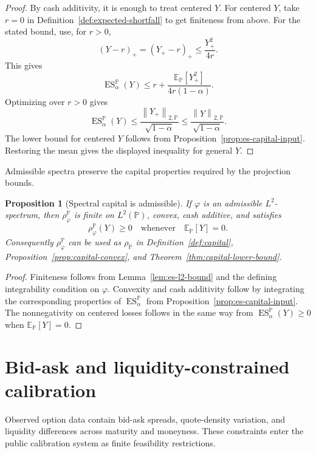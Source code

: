 \documentclass[11pt,a4paper]{amsart}
\theoremstyle{plain}
\newtheorem{proposition}[theorem]{Proposition}
\theoremstyle{definition}
\theoremstyle{remark}
\newcommand{\PP}{\mathbb{P}}
\newcommand{\EE}{\mathbb{E}}
\newcommand{\norm}[1]{\left\lVert #1\right\rVert}
\newcommand{\ES}{\operatorname{ES}}
\begin{document}
\begin{proof}
By cash additivity, it is enough to treat centered \(Y\).  For centered \(Y\), take \(r=0\) in
Definition~\ref{def:expected-shortfall} to get finiteness from above.  For the stated bound, use,
for \(r>0\),
\[
        (Y-r)_+=(Y_+-r)_+\le \frac{Y_+^2}{4r}.
\]
This gives
\[
        \ES_\alpha^\PP(Y)
        \le
        r+\frac{\EE_\PP[Y_+^2]}{4r(1-\alpha)}.
\]
Optimizing over \(r>0\) gives
\[
        \ES_\alpha^\PP(Y)
        \le
        \frac{\norm{Y_+}_{2,\PP}}{\sqrt{1-\alpha}}
        \le
        \frac{\norm{Y}_{2,\PP}}{\sqrt{1-\alpha}}.
\]
The lower bound for centered \(Y\) follows from Proposition~\ref{prop:es-capital-input}.  Restoring
the mean gives the displayed inequality for general \(Y\).
\end{proof}

Admissible spectra preserve the capital properties required by the projection bounds.

\begin{proposition}[Spectral capital is admissible]\label{prop:spectral-admissible}
If \(\varphi\) is an admissible \(L^2\)-spectrum, then
\(\rho_{\varphi}^{\PP}\) is finite on \(L^2(\PP)\), convex, cash additive, and satisfies
\[
        \rho_\varphi^\PP(Y)\ge0
        \quad\text{whenever}\quad
        \EE_\PP[Y]=0.
\]
Consequently \(\rho_\varphi^\PP\) can be used as \(\rho_\PP\) in
Definition~\ref{def:capital}, Proposition~\ref{prop:capital-convex}, and
Theorem~\ref{thm:capital-lower-bound}.
\end{proposition}

\begin{proof}
Finiteness follows from Lemma~\ref{lem:es-l2-bound} and the defining integrability condition on
\(\varphi\).  Convexity and cash additivity follow by integrating the corresponding properties of
\(\ES_\alpha^\PP\) from Proposition~\ref{prop:es-capital-input}.  The nonnegativity on centered
losses follows in the same way from \(\ES_\alpha^\PP(Y)\ge0\) when \(\EE_\PP[Y]=0\).
\end{proof}

\section{Bid-ask and liquidity-constrained calibration}\label{app:bidask}

Observed option data contain bid-ask spreads, quote-density variation, and liquidity differences
across maturity and moneyness.  These constraints enter the public calibration system as finite
feasibility restrictions.
\end{document}
